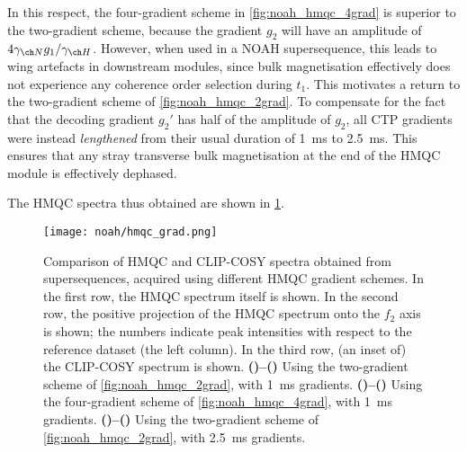 In this respect, the four-gradient scheme in \cref{fig:noah_hmqc_4grad} is superior to the two-gradient scheme, because the gradient $g_2$ will have an amplitude of $4\gammaN g_1/\gammaH$.
However, when used in a NOAH supersequence, this leads to wing artefacts in downstream modules, since bulk  magnetisation effectively does not experience any coherence order selection during $t_1$.
This motivates a return to the two-gradient scheme of \cref{fig:noah_hmqc_2grad}.
To compensate for the fact that the decoding gradient $g_2'$ has half of the amplitude of $g_2$, all CTP gradients were instead \textit{lengthened} from their usual duration of \qty{1}{\ms} to \qty{2.5}{\ms}.
This ensures that any stray transverse bulk magnetisation at the end of the HMQC module is effectively dephased.

The HMQC spectra thus obtained are shown in \cref{fig:hmqc_grad_spec}.

\begin{figure}[!ht]
    \centering
    \texttt{[image: noah/hmqc\_grad.png]}%
    {\label{fig:hmqc_grad_spec_2grad_1ms_hmqc}}%
    {\label{fig:hmqc_grad_spec_2grad_1ms_hmqcp}}%
    {\label{fig:hmqc_grad_spec_2grad_1ms_cosy}}%
    {\label{fig:hmqc_grad_spec_4grad_1ms_hmqc}}%
    {\label{fig:hmqc_grad_spec_4grad_1ms_hmqcp}}%
    {\label{fig:hmqc_grad_spec_4grad_1ms_cosy}}%
    {\label{fig:hmqc_grad_spec_2grad_2p5ms_hmqc}}%
    {\label{fig:hmqc_grad_spec_2grad_2p5ms_hmqcp}}%
    {\label{fig:hmqc_grad_spec_2grad_2p5ms_cosy}}%
    \caption[Comparison of  modules with different HMQC gradient schemes]{
        Comparison of HMQC and CLIP-COSY spectra obtained from  supersequences, acquired using different HMQC gradient schemes.
        In the first row, the HMQC spectrum itself is shown.
        In the second row, the positive projection of the HMQC spectrum onto the $f_2$ axis is shown; the numbers indicate peak intensities with respect to the reference dataset (the left column).
        In the third row, (an inset of) the CLIP-COSY spectrum is shown.
        \textbf{()--()} Using the two-gradient scheme of \cref{fig:noah_hmqc_2grad}, with \qty{1}{ms} gradients.
        \textbf{()--()} Using the four-gradient scheme of \cref{fig:noah_hmqc_4grad}, with \qty{1}{ms} gradients.
        \textbf{()--()} Using the two-gradient scheme of \cref{fig:noah_hmqc_2grad}, with \qty{2.5}{ms} gradients.
    }
    \label{fig:hmqc_grad_spec}
\end{figure}
